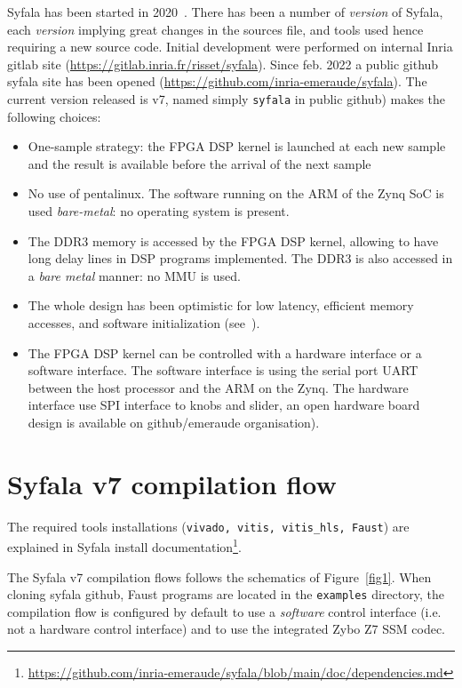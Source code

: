 \documentclass[11pt]{article}
\numberwithin{equation}{section}
\numberwithin{figure}{section}
\newcommand{\syfala}{{Syfala}\xspace}
\begin{document}
Syfala has been started in 2020~\cite{Risset20,SMC22}.  There has been a number of {\em version} of Syfala, each {\em version} implying great changes in the sources file, and tools used hence requiring a new source code. Initial development were performed on internal Inria gitlab site (\url{https://gitlab.inria.fr/risset/syfala}). Since feb. 2022 a public github syfala site has been opened (\url{https://github.com/inria-emeraude/syfala}). The current version released is v7, named simply {\tt syfala} in public github) makes the following choices:
\begin{itemize}
\item One-sample strategy: the FPGA DSP kernel is launched at each new sample and the result is available before the arrival of the next sample
\item No use of pentalinux. The software running on the ARM of the Zynq SoC is used {\em bare-metal}: no operating system is present.
\item The DDR3 memory is accessed by the FPGA DSP kernel, allowing to have long delay lines in DSP programs implemented. The DDR3 is also accessed in a {\em bare metal} manner: no MMU is used.
\item The whole design has been optimistic for low latency, efficient memory accesses, and software initialization  (see~\cite{SMC22}).
\item The FPGA DSP kernel can be controlled with a hardware interface or a software interface. The software interface is using the serial port UART between the host processor and the ARM on the Zynq. The hardware interface use SPI interface to knobs and slider, an open hardware board design is available on github/emeraude organisation).
\end{itemize}
\newpage

\section{Syfala v7 compilation flow}
\label{syfala1}
The required tools installations ({\tt vivado, vitis, vitis\_hls, Faust}) are explained in Syfala install documentation\footnote{\href{https://github.com/inria-emeraude/syfala/blob/main/doc/dependencies.md}{https://github.com/inria-emeraude/syfala/blob/main/doc/dependencies.md}}.

The  \syfala v7 compilation flows  follows the schematics of Figure~\ref{fig1}. When cloning syfala github, Faust programs are located in the {\tt examples} directory, the compilation flow is configured by default to use a {\em software} control interface (i.e. not a hardware control interface) and to use the integrated Zybo Z7 SSM codec. 
\end{document}
